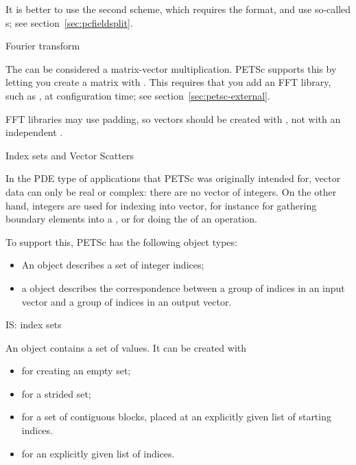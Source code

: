 It is better to use the second scheme, which requires the
 format,
and use so-called s;
see section~\ref{sec:pcfieldsplit}.

 {Fourier transform}
\label{sec:petscfft}

The  can be considered a matrix-vector multiplication.
PETSc supports this by letting you create a matrix with .
This requires that you add an FFT library, such as ,
at configuration time; see section~\ref{sec:petsc-external}.

FFT libraries may use padding, so vectors should be created with
,
not with an independent .

 {Index sets and Vector Scatters}

In the \ac{PDE} type of applications that PETSc was originally intended for,
vector data can only be real or complex: there are no vector of integers.
On the other hand, integers are used for indexing into vector,
for instance for gathering boundary elements into a ,
or for doing the  of an  operation.

To support this, PETSc has the following object types:
\begin{itemize}
\item An  object describes a set of integer indices;
\item a  object describes the correspondence between
  a group of indices in an input vector and a group of indices in an output vector.
\end{itemize}

 {IS: index sets}
\label{sec:petsc-is}

An  object contains a set of  values.
It can be created with
\begin{itemize}
\item {} for creating an empty set;
\item {} for a strided set;
\item {} for a set of contiguous blocks,
  placed at an explicitly given list of starting indices.
\item {} for an explicitly given list of indices.
\end{itemize}

